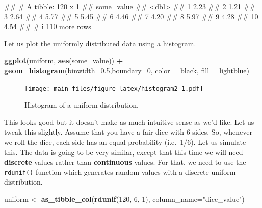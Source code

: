 \documentclass[
]{book}
\newenvironment{Shaded}{\begin{snugshade}}{\end{snugshade}}
\newcommand{\AttributeTok}[1]{\textcolor[rgb]{0.13,0.29,0.53}{#1}}
\newcommand{\DecValTok}[1]{\textcolor[rgb]{0.00,0.00,0.81}{#1}}
\newcommand{\FloatTok}[1]{\textcolor[rgb]{0.00,0.00,0.81}{#1}}
\newcommand{\FunctionTok}[1]{\textcolor[rgb]{0.13,0.29,0.53}{\textbf{#1}}}
\newcommand{\NormalTok}[1]{#1}
\newcommand{\OtherTok}[1]{\textcolor[rgb]{0.56,0.35,0.01}{#1}}
\newcommand{\SpecialCharTok}[1]{\textcolor[rgb]{0.81,0.36,0.00}{\textbf{#1}}}
\newcommand{\StringTok}[1]{\textcolor[rgb]{0.31,0.60,0.02}{#1}}
\begin{document}
\begin{Shaded}
\begin{Highlighting}[]
\NormalTok{\#\# \# A tibble: 120 x 1}
\NormalTok{\#\#    some\_value}
\NormalTok{\#\#         \textless{}dbl\textgreater{}}
\NormalTok{\#\#  1       2.23}
\NormalTok{\#\#  2       1.21}
\NormalTok{\#\#  3       2.64}
\NormalTok{\#\#  4       5.77}
\NormalTok{\#\#  5       5.45}
\NormalTok{\#\#  6       4.46}
\NormalTok{\#\#  7       4.20}
\NormalTok{\#\#  8       5.97}
\NormalTok{\#\#  9       4.28}
\NormalTok{\#\# 10       4.54}
\NormalTok{\#\# \# i 110 more rows}
\end{Highlighting}
\end{Shaded}

Let us plot the uniformly distributed data using a histogram.

\begin{Shaded}
\begin{Highlighting}[]
\FunctionTok{ggplot}\NormalTok{(uniform, }\FunctionTok{aes}\NormalTok{(some\_value)) }\SpecialCharTok{+}
        \FunctionTok{geom\_histogram}\NormalTok{(}\AttributeTok{binwidth=}\FloatTok{0.5}\NormalTok{,}\AttributeTok{boundary=}\DecValTok{0}\NormalTok{,}
                       \AttributeTok{color =} \StringTok{\textquotesingle{}black\textquotesingle{}}\NormalTok{,}
                       \AttributeTok{fill =} \StringTok{\textquotesingle{}lightblue\textquotesingle{}}\NormalTok{)}
\end{Highlighting}
\end{Shaded}

\begin{figure}
\centering
\texttt{[image: main\_files/figure-latex/histogram2-1.pdf]}
\caption{\label{fig:histogram2}Histogram of a uniform distribution.}
\end{figure}

This looks good but it doesn't make as much intuitive sense as we'd like. Let us tweak this slightly. Assume that you have a fair dice with 6 sides. So, whenever we roll the dice, each side has an equal probability (i.e.~1/6). Let us simulate this. The data is going to be very similar, except that this time we will need \textbf{discrete} values rather than \textbf{continuous} values. For that, we need to use the \texttt{rdunif()} function which generates random values with a discrete uniform distribution.

\begin{Shaded}
\begin{Highlighting}[]
\NormalTok{uniform }\OtherTok{\textless{}{-}} \FunctionTok{as\_tibble\_col}\NormalTok{(}\FunctionTok{rdunif}\NormalTok{(}\DecValTok{120}\NormalTok{, }\DecValTok{6}\NormalTok{, }\DecValTok{1}\NormalTok{), }\AttributeTok{column\_name=}\StringTok{"dice\_value"}\NormalTok{)}
\end{Highlighting}
\end{Shaded}
\end{document}

